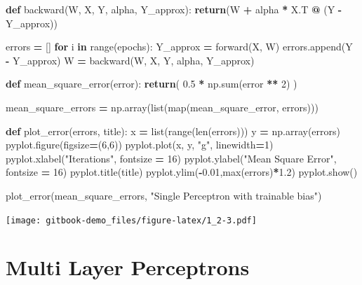 \documentclass[
]{book}
\newenvironment{Shaded}{\begin{snugshade}}{\end{snugshade}}
\newcommand{\BuiltInTok}[1]{#1}
\newcommand{\ControlFlowTok}[1]{\textcolor[rgb]{0.13,0.29,0.53}{\textbf{#1}}}
\newcommand{\DecValTok}[1]{\textcolor[rgb]{0.00,0.00,0.81}{#1}}
\newcommand{\FloatTok}[1]{\textcolor[rgb]{0.00,0.00,0.81}{#1}}
\newcommand{\KeywordTok}[1]{\textcolor[rgb]{0.13,0.29,0.53}{\textbf{#1}}}
\newcommand{\NormalTok}[1]{#1}
\newcommand{\OperatorTok}[1]{\textcolor[rgb]{0.81,0.36,0.00}{\textbf{#1}}}
\newcommand{\StringTok}[1]{\textcolor[rgb]{0.31,0.60,0.02}{#1}}
\begin{document}
\begin{Shaded}
\begin{Highlighting}[]
\KeywordTok{def}\NormalTok{ backward(W, X, Y, alpha, Y\_approx):}
    \ControlFlowTok{return}\NormalTok{(W }\OperatorTok{+}\NormalTok{ alpha }\OperatorTok{*}\NormalTok{ X.T }\OperatorTok{@}\NormalTok{ (Y }\OperatorTok{{-}}\NormalTok{ Y\_approx))}
  
  
\NormalTok{errors }\OperatorTok{=}\NormalTok{ []}
\ControlFlowTok{for}\NormalTok{ i }\KeywordTok{in} \BuiltInTok{range}\NormalTok{(epochs):}
\NormalTok{  Y\_approx }\OperatorTok{=}\NormalTok{ forward(X, W)}
\NormalTok{  errors.append(Y }\OperatorTok{{-}}\NormalTok{ Y\_approx)}
\NormalTok{  W }\OperatorTok{=}\NormalTok{ backward(W, X, Y, alpha, Y\_approx)}
  
  
  
\KeywordTok{def}\NormalTok{ mean\_square\_error(error):}
  \ControlFlowTok{return}\NormalTok{( }\FloatTok{0.5} \OperatorTok{*}\NormalTok{ np.}\BuiltInTok{sum}\NormalTok{(error }\OperatorTok{**} \DecValTok{2}\NormalTok{) )}


\NormalTok{mean\_square\_errors }\OperatorTok{=}\NormalTok{ np.array(}\BuiltInTok{list}\NormalTok{(}\BuiltInTok{map}\NormalTok{(mean\_square\_error, errors)))}


\KeywordTok{def}\NormalTok{ plot\_error(errors, title):}
\NormalTok{  x }\OperatorTok{=} \BuiltInTok{list}\NormalTok{(}\BuiltInTok{range}\NormalTok{(}\BuiltInTok{len}\NormalTok{(errors)))}
\NormalTok{  y }\OperatorTok{=}\NormalTok{ np.array(errors)}
\NormalTok{  pyplot.figure(figsize}\OperatorTok{=}\NormalTok{(}\DecValTok{6}\NormalTok{,}\DecValTok{6}\NormalTok{))}
\NormalTok{  pyplot.plot(x, y, }\StringTok{"g"}\NormalTok{, linewidth}\OperatorTok{=}\DecValTok{1}\NormalTok{)}
\NormalTok{  pyplot.xlabel(}\StringTok{"Iterations"}\NormalTok{, fontsize }\OperatorTok{=} \DecValTok{16}\NormalTok{)}
\NormalTok{  pyplot.ylabel(}\StringTok{"Mean Square Error"}\NormalTok{, fontsize }\OperatorTok{=} \DecValTok{16}\NormalTok{)}
\NormalTok{  pyplot.title(title)}
\NormalTok{  pyplot.ylim(}\OperatorTok{{-}}\FloatTok{0.01}\NormalTok{,}\BuiltInTok{max}\NormalTok{(errors)}\OperatorTok{*}\FloatTok{1.2}\NormalTok{)}
\NormalTok{  pyplot.show()}
  
  
\NormalTok{plot\_error(mean\_square\_errors, }\StringTok{"Single Perceptron with trainable bias"}\NormalTok{)}
\end{Highlighting}
\end{Shaded}

\texttt{[image: gitbook-demo\_files/figure-latex/1\_2-3.pdf]}

\hypertarget{multi-layer-perceptrons}{%
\chapter{Multi Layer Perceptrons}\label{multi-layer-perceptrons}}
\end{document}
